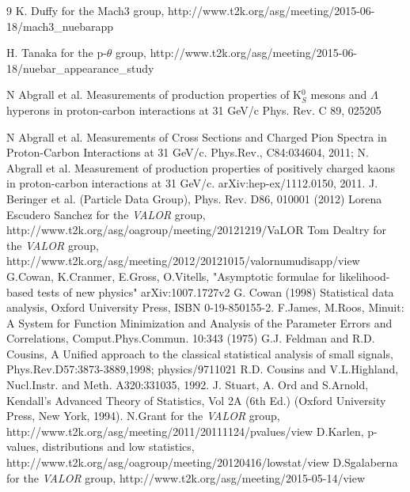 \begin{thebibliography}{9}
K. Duffy for the Mach3 group,
http://www.t2k.org/asg/meeting/2015-06-18/mach3\_nuebarapp

H. Tanaka for the p-$\theta$ group,
http://www.t2k.org/asg/meeting/2015-06-18/nuebar\_appearance\_study

%
%

  N Abgrall et al. Measurements of production properties of K$^{0}_{S}$ mesons and $\Lambda$ hyperons in proton-carbon interactions at 31 GeV/c
  Phys. Rev. C 89, 025205

  N Abgrall et al. Measurements of Cross Sections and Charged Pion Spectra in Proton-Carbon Interactions
  at 31 GeV/c. Phys.Rev., C84:034604, 2011;
  N. Abgrall et al. Measurement of production properties of positively charged kaons in proton-carbon
  interactions at 31 GeV/c. arXiv:hep-ex/1112.0150, 2011.
%
%
  J. Beringer et al. (Particle Data Group), Phys. Rev. D86, 010001 (2012)
%
%
  Lorena Escudero Sanchez for the {\em VALOR} group, 
  http://www.t2k.org/asg/oagroup/meeting/20121219/VaLOR%
  Tom Dealtry for the {\em VALOR} group,
  http://www.t2k.org/asg/meeting/2012/20121015/valornumudisapp/view
%
%
G.Cowan, K.Cranmer, E.Gross, O.Vitells,
"Asymptotic formulae for likelihood-based tests of new physics"
arXiv:1007.1727v2
  G. Cowan (1998) Statistical data analysis, 
  Oxford University Press, ISBN 0-19-850155-2.
  F.James, M.Roos, Minuit: A System for Function Minimization and Analysis of the 
  Parameter Errors and Correlations, Comput.Phys.Commun. 10:343 (1975)
  G.J. Feldman and R.D. Cousins,
  A Unified approach to the classical statistical analysis of small signals,
  Phys.Rev.D57:3873-3889,1998; physics/9711021
  R.D. Cousins and V.L.Highland, 
  Nucl.Instr. and Meth. A320:331035, 1992.
J. Stuart, A. Ord and S.Arnold,
Kendall's Advanced Theory of Statistics, Vol 2A (6th Ed.) 
(Oxford University Press, New York, 1994).
 N.Grant for the {\em VALOR} group,
 http://www.t2k.org/asg/meeting/2011/20111124/pvalues/view
 D.Karlen,
 p-values, distributions and low statistics,
 http://www.t2k.org/asg/oagroup/meeting/20120416/lowstat/view
 D.Sgalaberna for the {\em VALOR} group,
 http://www.t2k.org/asg/meeting/2015-05-14/view
 

\end{thebibliography}
